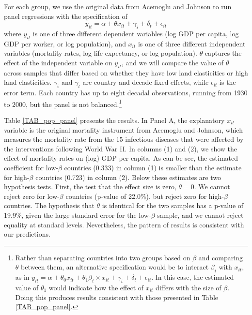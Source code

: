 \documentclass[11pt]{article}
\begin{document}
For each group, we use the original data from Acemoglu and Johnson to run panel regressions with the specification of
\begin{equation}
    y_{it} = \alpha + \theta x_{it} + \gamma_i + \delta_t + \epsilon_{it}
\end{equation}
where $y_{it}$ is one of three different dependent variables (log GDP per capita, log GDP per worker, or log population), and $x_{it}$ is one of three different independent variables (mortality rates, log life expectancy, or log population). $\theta$ captures the effect of the independent variable on $y_{it}$, and we will compare the value of $\theta$ across samples that differ based on whether they have low land elasticities or high land elasticities. $\gamma_i$ and $\gamma_t$ are country and decade fixed effects, while $\epsilon_{it}$ is the error term. Each country has up to eight decadal observations, running from 1930 to 2000, but the panel is not balanced.\footnote{Rather than separating countries into two groups based on $\beta$ and comparing $\theta$ between them, an alternative specification would be to interact $\beta_i$ with $x_{it}$, as in $y_{it} = \alpha + \theta_0 x_{it} + \theta_1 \beta_i \times x_{it} + \gamma_i + \delta_t + \epsilon_{it}$. In this case, the estimated value of $\theta_1$ would indicate how the effect of $x_{it}$ differs with the size of $\beta$. Doing this produces results consistent with those presented in Table \ref{TAB_pop_panel}.}

Table \ref{TAB_pop_panel} presents the results. In Panel A, the explanatory $x_{it}$ variable is the original mortality instrument from Acemoglu and Johnson, which measures the mortality rate from the 15 infectious diseases that were affected by the interventions following World War II. In columns (1) and (2), we show the effect of mortality rates on (log) GDP per capita. As can be see, the estimated coefficient for low-$\beta$ countries (0.333) in column (1) is smaller than the estimate for high-$\beta$ countries (0.723) in column (2). Below these estimates are two hypothesis tests. First, the test that the effect size is zero, $\theta=0$. We cannot reject zero for low-$\beta$ countries (p-value of 22.0\%), but reject zero for high-$\beta$ countries. The hypothesis that $\theta$ is identical for the two samples has a p-value of 19.9\%, given the large standard error for the low-$\beta$ sample, and we cannot reject equality at standard levels. Nevertheless, the pattern of results is consistent with our predictions.
\end{document}
